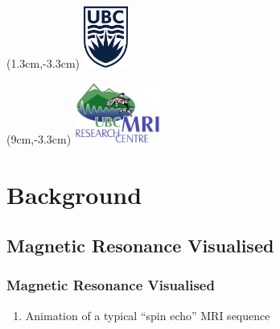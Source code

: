 



\begin{frame}
\titlepage
\begin{textblock*}{2cm}(1.3cm,-3.3cm)
    \includegraphics[height=2cm]{figures/ubc-logo}
\end{textblock*}
\begin{textblock*}{2cm}(9cm,-3.3cm)
    \includegraphics[height=2cm]{figures/UBC-MRI-logo}
\end{textblock*}
\end{frame}

\begin{frame}
\tableofcontents
\end{frame}


\section{Background}

\subsection{Magnetic Resonance Visualised}

\begin{frame}
\frametitle{Magnetic Resonance Visualised}
\begin{enumerate}
    \item Animation of a typical ``spin echo'' MRI sequence
\end{enumerate}
\centering
{}
\end{frame}


